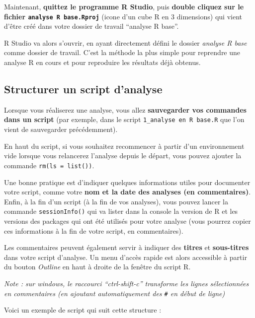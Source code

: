 \documentclass[
]{book}
\begin{document}
Maintenant, \textbf{quittez le programme R Studio}, puis \textbf{double cliquez sur le fichier \texttt{analyse\ R\ base.Rproj}} (icone d'un cube R en 3 dimensions) qui vient d'être créé dans votre dossier de travail ``analyse R base''.

R Studio va alors s'ouvrir, en ayant directement défini le dossier \emph{analyse R base} comme dossier de travail. C'est la méthode la plus simple pour reprendre une analyse R en cours et pour reproduire les résultats déjà obtenus.

\subsection{Structurer un script d'analyse}\label{structurer-un-script-danalyse}

Lorsque vous réaliserez une analyse, vous allez \textbf{sauvegarder vos commandes dans un script} (par exemple, dans le script \texttt{1\_analyse\ en\ R\ base.R} que l'on vient de sauvegarder précédemment).

En haut du script, si vous souhaitez recommencer à partir d'un environnement vide lorsque vous relancerez l'analyse depuis le départ, vous pouvez ajouter la commande \texttt{rm(ls\ =\ list())}.

Une bonne pratique est d'indiquer quelques informations utiles pour documenter votre script, comme votre \textbf{nom et la date des analyses (en commentaires)}. Enfin, à la fin d'un script (à la fin de vos analyses), vous pouvez lancer la commande \texttt{sessionInfo()} qui va lister dans la console la version de R et les versions des packages qui ont été utilisés pour votre analyse (vous pourrez copier ces informations à la fin de votre script, en commentaires).

Les commentaires peuvent également servir à indiquer des \textbf{titres} et \textbf{sous-titres} dans votre script d'analyse. Un menu d'accès rapide est alors accessible à partir du bouton \emph{Outline} en haut à droite de la fenêtre du script R.

\emph{Note : sur windows, le raccourci ``ctrl-shift-c'' transforme les lignes sélectionnées en commentaires (en ajoutant automatiquement des \texttt{\#} en début de ligne)}

Voici un exemple de script qui suit cette structure :
\end{document}
